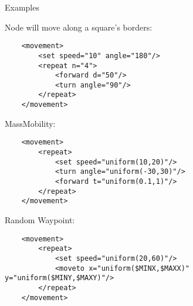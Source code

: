 
Examples

Node will move along a square's borders:

\begin{verbatim}
    <movement>
        <set speed="10" angle="180"/>
        <repeat n="4">
            <forward d="50"/>
            <turn angle="90"/>
        </repeat>
    </movement>
\end{verbatim}

MassMobility:

\begin{verbatim}
    <movement>
        <repeat>
            <set speed="uniform(10,20)"/>
            <turn angle="uniform(-30,30)"/>
            <forward t="uniform(0.1,1)"/>
        </repeat>
    </movement>
\end{verbatim}

Random Waypoint:

\begin{verbatim}
    <movement>
        <repeat>
            <set speed="uniform(20,60)"/>
            <moveto x="uniform($MINX,$MAXX)" y="uniform($MINY,$MAXY)"/>
        </repeat>
    </movement>
\end{verbatim}




